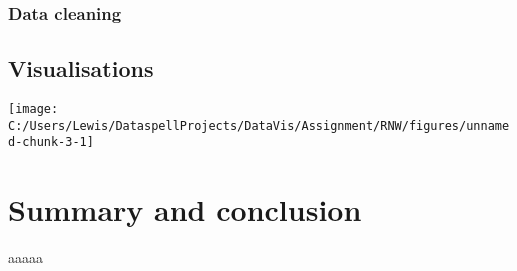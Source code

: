 \documentclass[12pt]{report}\usepackage[]{graphicx}\usepackage[]{xcolor}
\newenvironment{knitrout}{}{} %
\begin{document}
    \subsection{Data cleaning}

    \section{Visualisations}
\begin{knitrout}
\color{fgcolor}

{\centering \texttt{[image: C:/Users/Lewis/DataspellProjects/DataVis/Assignment/RNW/figures/unnamed-chunk-3-1]} 

}


\end{knitrout}

    \chapter{Summary and conclusion}

    aaaaa
    
    \printbibliography{}
\end{document}
